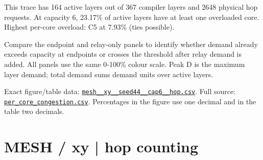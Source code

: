 \documentclass[10pt,a4paper]{article}
\begin{document}
This trace has 164 active layers out of 367 compiler layers and 2648 physical hop requests. At capacity 6, 23.17\% of active layers have at least one overloaded core. Highest per-core overload: C5 at 7.93\% (ties possible).\par
Compare the endpoint and relay-only panels to identify whether demand already exceeds capacity at endpoints or crosses the threshold after relay demand is added. All panels use the same 0-100\% colour scale. Peak D is the maximum layer demand; total demand sums demand units over active layers.\par
Exact figure/table data: \href{\detokenize{file:///home/dhruv-pansuriya/Documents/BTP/Compiler-Driven-ACE/output/pdf/qaoa_methods_congestion/tables/mesh__xy__seed44__cap6__hop.csv}}{\nolinkurl{mesh__xy__seed44__cap6__hop.csv}}. Full source: \href{\detokenize{file:///home/dhruv-pansuriya/Documents/BTP/Compiler-Driven-ACE/results/qaoa_2seed_2026-10-26/congestion/per_core_congestion.csv}}{\nolinkurl{per_core_congestion.csv}}. Percentages in the figure use one decimal and in the table two decimals.\par
\clearpage
\section*{MESH / xy | hop counting}
\end{document}
